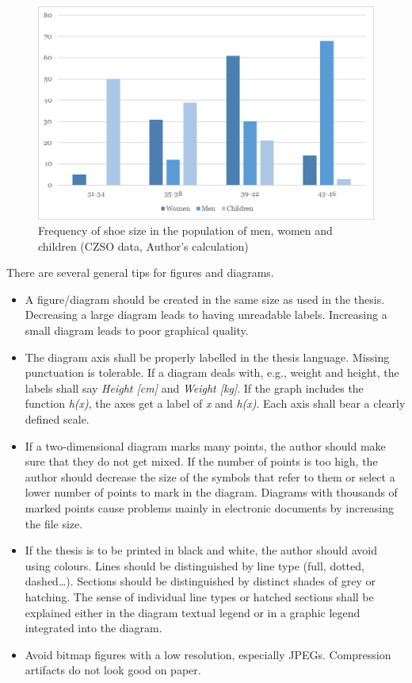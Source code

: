 \begin{figure}[htbp!]\centering
\includegraphics[width=.66\textwidth]{img/example-fig}
\caption{Frequency of shoe size in the population of men, women and children (CZSO data, Author’s calculation)}
\label{fig:freq-shoe-size}
\end{figure}

There are several general tips for figures and diagrams.

\begin{itemize}

\item A figure/diagram should be created in the same size as used in the thesis. 
Decreasing a large diagram leads to having unreadable labels. Increasing a small 
diagram leads to poor graphical quality.

\item The diagram axis shall be properly labelled in the thesis language. 
Missing punctuation is tolerable. If a diagram deals with, e.g., weight and 
height, the labels shall say \emph{Height [cm]} and \emph{Weight [kg]}. If the 
graph includes the function \emph{h(x)}, the axes get a label of \emph{x} and 
\emph{h(x)}. Each axis shall bear a clearly defined scale. 

\item If a two-dimensional diagram marks many points, the author should make 
sure that they do not get mixed. If the number of points is too high, the author 
should decrease the size of the symbols that refer to them or select a lower 
number of points to mark in the diagram. Diagrams with thousands of marked 
points cause problems mainly in electronic documents by increasing the file 
size. 

\item If the thesis is to be printed in black and white, the author should avoid 
using colours. Lines should be distinguished by line type (full, dotted, 
dashed…). Sections should be distinguished by distinct shades of grey or 
hatching. The sense of individual line types or hatched sections shall be 
explained either in the diagram textual legend or in a graphic legend integrated 
into the diagram. 

\item Avoid bitmap figures with a low resolution, especially JPEGs. Compression 
artifacts do not look good on paper. 

\end{itemize}


